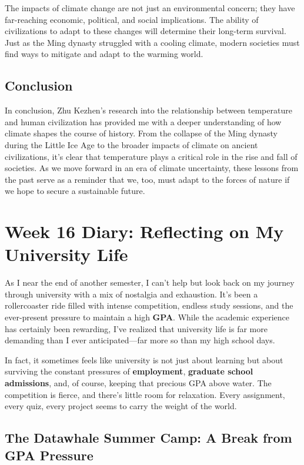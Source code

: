 \documentclass[a4paper]{article} 	%
\begin{document}
The impacts of climate change are not just an environmental concern; they have far-reaching economic, political, and social implications. The ability of civilizations to adapt to these changes will determine their long-term survival. Just as the Ming dynasty struggled with a cooling climate, modern societies must find ways to mitigate and adapt to the warming world.

\subsection*{Conclusion}

In conclusion, Zhu Kezhen’s research into the relationship between temperature and human civilization has provided me with a deeper understanding of how climate shapes the course of history. From the collapse of the Ming dynasty during the Little Ice Age to the broader impacts of climate on ancient civilizations, it’s clear that temperature plays a critical role in the rise and fall of societies. As we move forward in an era of climate uncertainty, these lessons from the past serve as a reminder that we, too, must adapt to the forces of nature if we hope to secure a sustainable future.


\section{Week 16 Diary: Reflecting on My University Life}

As I near the end of another semester, I can’t help but look back on my journey through university with a mix of nostalgia and exhaustion. It’s been a rollercoaster ride filled with intense competition, endless study sessions, and the ever-present pressure to maintain a high \textbf{GPA}. While the academic experience has certainly been rewarding, I’ve realized that university life is far more demanding than I ever anticipated—far more so than my high school days.

In fact, it sometimes feels like university is not just about learning but about surviving the constant pressures of \textbf{employment}, \textbf{graduate school admissions}, and, of course, keeping that precious GPA above water. The competition is fierce, and there’s little room for relaxation. Every assignment, every quiz, every project seems to carry the weight of the world.

\subsection*{The Datawhale Summer Camp: A Break from GPA Pressure}
\end{document}
